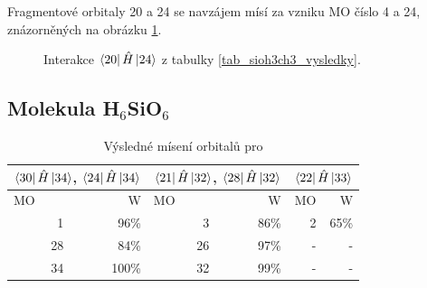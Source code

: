 \documentclass[
  digital, %
  table,   %
  lof,     %
  lot,     %
]{fithesis3}
\begin{document}
Fragmentové orbitaly  20 a 24 se navzájem mísí za vzniku MO číslo 4 a 24, znázorněných na obrázku \ref{obr_sioh3ch3_vysledky_IV}.   
\begin{figure}
\begin{center}
\caption{Interakce $\bra{20}{\hat{H}}\ket{24}$  z tabulky \ref{tab_sioh3ch3_vysledky}.}

\label{obr_sioh3ch3_vysledky_IV}\end{center}
\end{figure} 
  \subsection{Molekula H$_6$SiO$_6$}
 
  \begin{table}[htbp]
\caption{Výsledné mísení orbitalů pro }
\begin{center}
\begin{tabular}{|r|r|r|r|r|r|}
\hline
\multicolumn{2}{|c}{$\bra{30}{\hat{H}}\ket{34}$, $\bra{24}{\hat{H}}\ket{34}$} & \multicolumn{2}{|c|}{$\bra{21}{\hat{H}}\ket{32}$, $\bra{28}{\hat{H}}\ket{32}$}& \multicolumn{2}{|c|}{$\bra{22}{\hat{H}}\ket{33}$} \\
\hline \hline
\multicolumn{1}{|l|}{MO} & \multicolumn{1}{r|}{W} & \multicolumn{1}{l|}{MO} & \multicolumn{1}{r|}{W} & MO & \multicolumn{1}{r|}{W} \\ \hline
1 & 96\% & 3 & 86\% &2 & 65\% \\ \hline
28 & 84\% & 26 & 97\% & - & - \\ \hline
34 & 100\% & 32 & 99\% &  -& - \\ \hline
\end{tabular}

\label{tab_h6sio6_vysledky}\end{center}
\end{table}
   
\end{document}
